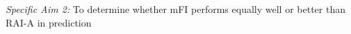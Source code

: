 \emph{Specific Aim 2:} To determine whether mFI performs equally well or better than RAI-A in prediction 